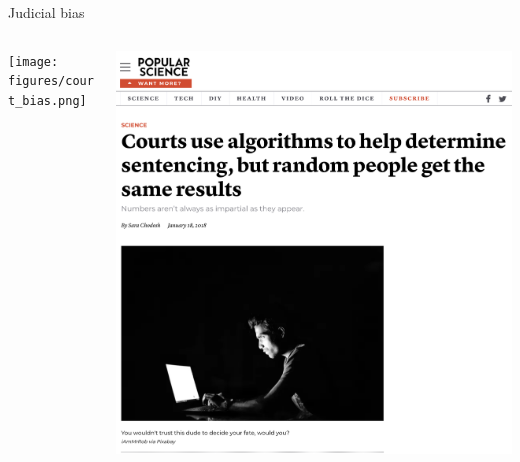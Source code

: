 \documentclass[presentation]{subfiles}
\begin{document}
\begin{frame}{Judicial bias}
  \begin{columns}[T]
    \begin{column}{0.49\textwidth}
      \centering
      \texttt{[image: figures/court\_bias.png]}
    \end{column}
    \begin{column}{0.49\textwidth}
      \centering
      \includegraphics[max width=\linewidth,keepaspectratio]{figures/court_more.png}
    \end{column}
  \end{columns}
\end{frame}
\end{document}
